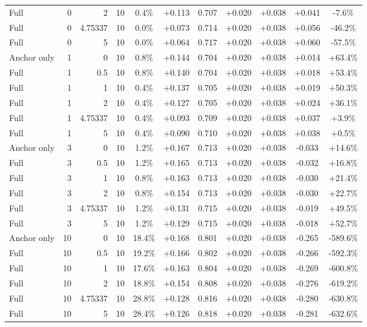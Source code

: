 \begin{table}[htbp]
\begin{tabular}{lrrrccccccc}
Full & 0 & 2 & 10 & 0.4\% & +0.113 & 0.707 & +0.020 & +0.038 & +0.041 & -7.6\% \\
Full & 0 & 4.75337 & 10 & 0.0\% & +0.073 & 0.714 & +0.020 & +0.038 & +0.056 & -46.2\% \\
Full & 0 & 5 & 10 & 0.0\% & +0.064 & 0.717 & +0.020 & +0.038 & +0.060 & -57.5\% \\
Anchor only & 1 & 0 & 10 & 0.8\% & +0.144 & 0.704 & +0.020 & +0.038 & +0.014 & +63.4\% \\
Full & 1 & 0.5 & 10 & 0.8\% & +0.140 & 0.704 & +0.020 & +0.038 & +0.018 & +53.4\% \\
Full & 1 & 1 & 10 & 0.4\% & +0.137 & 0.705 & +0.020 & +0.038 & +0.019 & +50.3\% \\
Full & 1 & 2 & 10 & 0.4\% & +0.127 & 0.705 & +0.020 & +0.038 & +0.024 & +36.1\% \\
Full & 1 & 4.75337 & 10 & 0.4\% & +0.093 & 0.709 & +0.020 & +0.038 & +0.037 & +3.9\% \\
Full & 1 & 5 & 10 & 0.4\% & +0.090 & 0.710 & +0.020 & +0.038 & +0.038 & +0.5\% \\
Anchor only & 3 & 0 & 10 & 1.2\% & +0.167 & 0.713 & +0.020 & +0.038 & -0.033 & +14.6\% \\
Full & 3 & 0.5 & 10 & 1.2\% & +0.165 & 0.713 & +0.020 & +0.038 & -0.032 & +16.8\% \\
Full & 3 & 1 & 10 & 0.8\% & +0.163 & 0.713 & +0.020 & +0.038 & -0.030 & +21.4\% \\
Full & 3 & 2 & 10 & 0.8\% & +0.154 & 0.713 & +0.020 & +0.038 & -0.030 & +22.7\% \\
Full & 3 & 4.75337 & 10 & 1.2\% & +0.131 & 0.715 & +0.020 & +0.038 & -0.019 & +49.5\% \\
Full & 3 & 5 & 10 & 1.2\% & +0.129 & 0.715 & +0.020 & +0.038 & -0.018 & +52.7\% \\
Anchor only & 10 & 0 & 10 & 18.4\% & +0.168 & 0.801 & +0.020 & +0.038 & -0.265 & -589.6\% \\
Full & 10 & 0.5 & 10 & 19.2\% & +0.166 & 0.802 & +0.020 & +0.038 & -0.266 & -592.3\% \\
Full & 10 & 1 & 10 & 17.6\% & +0.163 & 0.804 & +0.020 & +0.038 & -0.269 & -600.8\% \\
Full & 10 & 2 & 10 & 18.8\% & +0.154 & 0.808 & +0.020 & +0.038 & -0.276 & -619.2\% \\
Full & 10 & 4.75337 & 10 & 28.8\% & +0.128 & 0.816 & +0.020 & +0.038 & -0.280 & -630.8\% \\
Full & 10 & 5 & 10 & 28.4\% & +0.126 & 0.818 & +0.020 & +0.038 & -0.281 & -632.6\% \\

\end{tabular}
\end{table}
